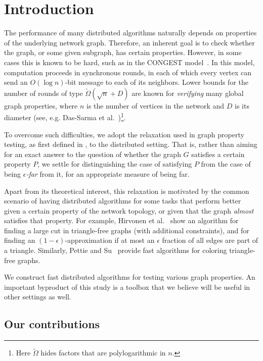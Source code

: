 \documentclass[11pt]{article}
\begin{document}
\section{Introduction}
\label{sec:intro}

The performance of many distributed algorithms naturally depends on
properties of the underlying network graph. Therefore, an inherent goal is
to check whether the graph, or some given subgraph, has certain properties.
However, in some cases this is known to be hard, such as in the CONGEST
model~\cite{Peleg00}. In this model, computation proceeds in synchronous
rounds, in each of which every vertex can send an $O(\log{n})$-bit message
to each of its neighbors. Lower bounds for the number of rounds of type
$\tilde{\Omega}(\sqrt{n}+D)$ are known for \emph{verifying} many global graph
properties, where $n$ is the number of vertices in the network and $D$ is
its diameter (see, e.g. Das-Sarma et
al.~\cite{SarmaHKKNPPW12})\footnote{Here $\tilde{\Omega}$ hides factors that are
polylogarithmic in $n$.}.

To overcome such difficulties, we adopt the relaxation used in graph property testing, as first defined in \cite{GGR98,GoldreichR02}, to the distributed setting. That is, rather than aiming for an exact answer to the question of whether the graph $G$ satisfies a certain property $P$, we settle for distinguishing the case of satisfying $P$ from the case of being \emph{$\epsilon$-far} from it, for an appropriate measure of being far.

Apart from its theoretical interest, this relaxation is motivated by the common scenario of having distributed algorithms for some tasks that perform better given a certain property of the network topology, or given that the graph \emph{almost} satisfies that property. For example, Hirvonen et al.~\cite{HirvonenRSS14} show an algorithm for finding a large cut in triangle-free graphs (with additional constraints), and for finding an $(1-\epsilon)$-approximation if at most an $\epsilon$ fraction of all edges are part of a triangle. Similarly, Pettie and Su~\cite{PettieS15} provide fast algorithms for coloring triangle-free graphs.

We construct fast distributed algorithms for testing various graph properties. An important byproduct of this study is a toolbox that we believe will be useful in other settings as well.

\subsection{Our contributions}
\end{document}
